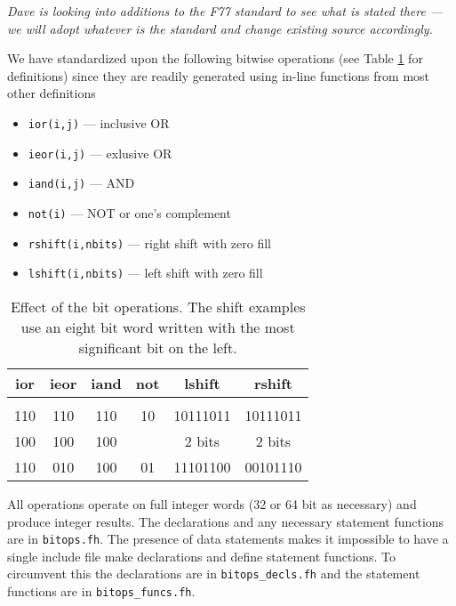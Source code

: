 {\em Dave is looking into additions to the F77 standard to see what 
is stated there --- we will adopt whatever is the standard and change
existing source accordingly.}

We have standardized upon the following bitwise operations (see Table
\ref{tabbit} for definitions) since they are readily generated using
in-line functions from most other definitions
\begin{itemize}
\item \verb+ior(i,j)+ --- inclusive OR
\item \verb+ieor(i,j)+ --- exlusive OR
\item \verb+iand(i,j)+ --- AND
\item \verb+not(i)+ --- NOT or one's complement
\item \verb+rshift(i,nbits)+ --- right shift with zero fill
\item \verb+lshift(i,nbits)+ --- left shift with zero fill
\end{itemize}
\begin{table}[h]
\begin{center}

\begin{tabular}{c|c|c|c|c|c}
 ior   &   ieor   &    iand  &   not  & lshift   & rshift   \\ \hline
       &          &          &        &          &          \\
 110   &   110    &    110   &   10   & 10111011 & 10111011 \\
 100   &   100    &    100   &        & 2 bits   & 2 bits   \\ \hline
 110   &   010    &    100   &   01   & 11101100 & 00101110 
\end{tabular}
\vspace{0.2in}
\caption{\label{tabbit} Effect of the bit operations.  The shift examples
  use an eight bit word written with the most significant bit on the
  left.}


\end{center}
\end{table}

All operations operate on full integer words (32 or 64 bit as
necessary) and produce integer results.  The declarations and any
necessary statement functions are in \verb+bitops.fh+.  The presence
of data statements makes it impossible to have a single include file
make declarations and define statement functions.  To circumvent this
the declarations are in \verb+bitops_decls.fh+ and the statement
functions are in \verb+bitops_funcs.fh+.

